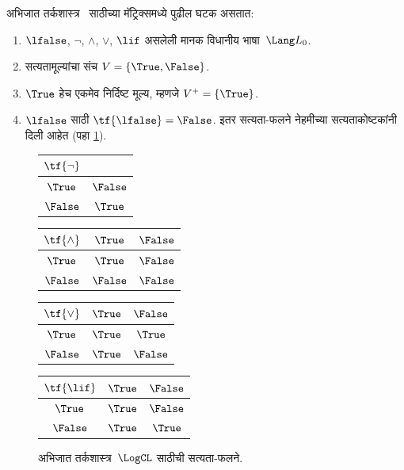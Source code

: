 \begin{ex}
अभिजात तर्कशास्त्र~\LogCL{} साठीच्या मॅट्रिक्समध्ये पुढील घटक असतात:
\begin{enumerate}
  \item $\lfalse$, $\lnot$, $\land$, $\lor$, $\lif$ असलेली
  मानक विधानीय भाषा~$\Lang L_0$.
  \item सत्यतामूल्यांचा संच $V = \{\True, \False\}$.
  \item $\True$ हेच एकमेव निर्दिष्ट मूल्य, म्हणजे $V^+ = \{\True\}$.
  \item $\lfalse$ साठी $\tf{\lfalse} = \False$. इतर सत्यता-फलने
  नेहमीच्या सत्यताकोष्टकांनी दिली आहेत (पहा
  \ref{mvl:syn:mat:fig:tf-CL}).
\end{enumerate}
\begin{figure}
  \begin{center}
      \begin{tabular}{c|c}
        $\tf{\lnot}$ & \\
        \hline
        $\True$ & $\False$ \\
        $\False$ & $\True$
      \end{tabular}
      \quad
      \begin{tabular}{c|cc}
        $\tf{\land}$ & $\True$ & $\False$ \\
        \hline
        $\True$ & $\True$ & $\False$ \\
        $\False$ & $\False$ & $\False$
      \end{tabular}
      \quad
      \begin{tabular}{c|cc}
        $\tf{\lor}$ & $\True$ & $\False$ \\
        \hline
        $\True$ & $\True$ & $\True$ \\
        $\False$ & $\True$ & $\False$
      \end{tabular}
      \quad
      \begin{tabular}{c|cc}
        $\tf{\lif}$ & $\True$ & $\False$ \\
        \hline
        $\True$ & $\True$ & $\False$ \\
        $\False$ & $\True$ & $\True$
      \end{tabular}
    \end{center}
    \caption{अभिजात तर्कशास्त्र~$\LogCL$ साठीची सत्यता-फलने.}
    \label{mvl:syn:mat:fig:tf-CL}
  \end{figure}
\end{ex}












